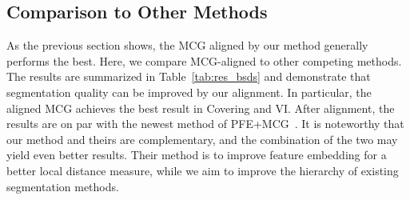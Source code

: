 \begin{table}
\begin{center} \small
{}
\end{center}
\caption{The results of our aligned hierarchies with a comparison to the original hierarchies.}
\label{tab:res_other_hier}
\end{table}

\subsection{Comparison to Other Methods}
As the previous section shows, the MCG aligned by our method generally
performs the best. Here, we compare MCG-aligned to other competing
methods. The results are summarized in Table~\ref{tab:res_bsds} and
demonstrate that segmentation quality can be improved by our
alignment. In particular, the aligned MCG achieves the best result in
Covering and VI. After alignment, the results are on
par with the newest method of PFE+MCG~\cite{yupiecewise}. It is
noteworthy that our method and theirs are complementary, and the
combination of the two may yield even better results. Their method is
to improve feature embedding for a better local distance measure,
while we aim to improve the hierarchy of existing segmentation methods. 

